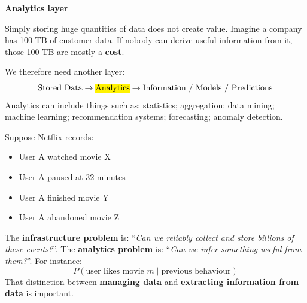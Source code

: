 \highspace
\begin{flushleft}
    \textcolor{Green3}{ \textbf{Analytics layer}}
\end{flushleft}
Simply storing huge quantities of data does not create value. Imagine a company has 100 TB of customer data. If nobody can derive useful information from it, those 100 TB are mostly a \textbf{cost}.

\highspace
We therefore need another layer:
\begin{equation*}
    \text{Stored Data}
    \rightarrow
    \text{\hl{Analytics}}
    \rightarrow
    \text{Information / Models / Predictions}
\end{equation*}
Analytics can include things such as: statistics; aggregation; data mining; machine learning; recommendation systems; forecasting; anomaly detection.

\highspace
\begin{examplebox}
    Suppose Netflix records:
    \begin{itemize}
        \item User A watched movie X
        \item User A paused at 32 minutes
        \item User A finished movie Y
        \item User A abandoned movie Z
    \end{itemize}
    The \textbf{infrastructure problem} is: ``\emph{Can we reliably collect and store billions of these events?}''. The \textbf{analytics problem} is: ``\emph{Can we infer something useful from them?}''. For instance:
    \begin{equation*}
        P(\text{user likes movie }m\mid\text{previous behaviour})
    \end{equation*}
    That distinction between \textbf{managing data} and \textbf{extracting information from data} is important.
\end{examplebox}

